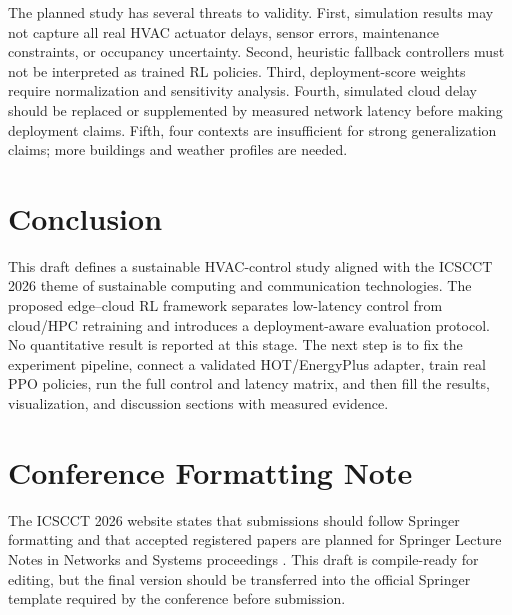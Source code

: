 \documentclass[11pt,a4paper]{article}
\begin{document}
The planned study has several threats to validity. First, simulation results may not capture all real HVAC actuator delays, sensor errors, maintenance constraints, or occupancy uncertainty. Second, heuristic fallback controllers must not be interpreted as trained RL policies. Third, deployment-score weights require normalization and sensitivity analysis. Fourth, simulated cloud delay should be replaced or supplemented by measured network latency before making deployment claims. Fifth, four contexts are insufficient for strong generalization claims; more buildings and weather profiles are needed.

\section{Conclusion}

This draft defines a sustainable HVAC-control study aligned with the ICSCCT 2026 theme of sustainable computing and communication technologies. The proposed edge--cloud RL framework separates low-latency control from cloud/HPC retraining and introduces a deployment-aware evaluation protocol. No quantitative result is reported at this stage. The next step is to fix the experiment pipeline, connect a validated HOT/EnergyPlus adapter, train real PPO policies, run the full control and latency matrix, and then fill the results, visualization, and discussion sections with measured evidence.

\section*{Conference Formatting Note}

The ICSCCT 2026 website states that submissions should follow Springer formatting and that accepted registered papers are planned for Springer Lecture Notes in Networks and Systems proceedings \cite{icscct2026submissions,icscct2026publications}. This draft is compile-ready for editing, but the final version should be transferred into the official Springer template required by the conference before submission.



\end{document}

